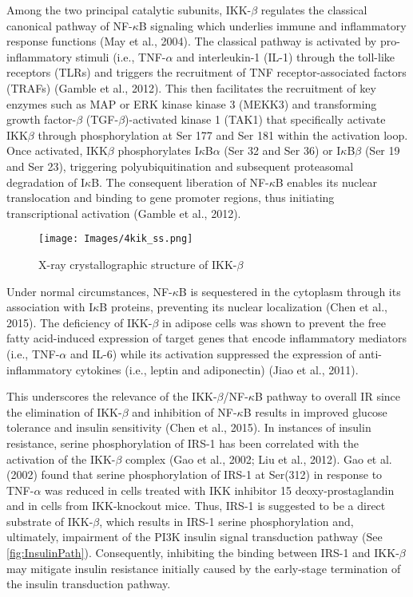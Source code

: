         
Among the two principal catalytic subunits, IKK-$\beta$ regulates the classical canonical pathway of NF-$\kappa$B signaling which underlies immune and inflammatory response functions (May et al., 2004). The classical pathway is activated by pro-inflammatory stimuli (i.e., TNF-$\alpha$ and interleukin-1 (IL-1) through the toll-like receptors (TLRs) and triggers the recruitment of TNF receptor-associated factors (TRAFs) (Gamble et al., 2012). This then facilitates the recruitment of key enzymes such as MAP or ERK kinase kinase 3 (MEKK3) and transforming growth factor-$\beta$ (TGF-$\beta$)-activated kinase 1 (TAK1) that specifically activate IKK$\beta$ through phosphorylation at Ser 177 and Ser 181 within the activation loop. Once activated, IKK$\beta$ phosphorylates I$\kappa$B$\alpha$ (Ser 32 and Ser 36) or I$\kappa$B$\beta$ (Ser 19 and Ser 23), triggering polyubiquitination and subsequent proteasomal degradation of I$\kappa$B. The consequent liberation of NF-$\kappa$B enables its nuclear translocation and binding to gene promoter regions, thus initiating transcriptional activation (Gamble et al., 2012).

    \begin{figure} 
        \centering
        \texttt{[image: Images/4kik\_ss.png]}
        \caption{X-ray crystallographic structure of IKK-$\beta$}
        \label{fig:4kik}
    \end{figure}

Under normal circumstances, NF-$\kappa$B is sequestered in the cytoplasm through its association with I$\kappa$B proteins, preventing its nuclear localization (Chen et al., 2015). The deficiency of IKK-$\beta$ in adipose cells was shown to prevent the free fatty acid-induced expression of target genes that encode inflammatory mediators (i.e., TNF-$\alpha$ and IL-6) while its activation suppressed the expression of anti-inflammatory cytokines (i.e., leptin and adiponectin) (Jiao et al., 2011). 

This underscores the relevance of the IKK-$\beta$/NF-$\kappa$B pathway to overall IR since the elimination of IKK-$\beta$ and inhibition of NF-$\kappa$B results in improved glucose tolerance and insulin sensitivity (Chen et al., 2015). In instances of insulin resistance, serine phosphorylation of IRS-1 has been correlated with the activation of the IKK-$\beta$ complex (Gao et al., 2002; Liu et al., 2012). Gao et al. (2002) found that serine phosphorylation of IRS-1 at Ser(312) in response to TNF-$\alpha$ was reduced in cells treated with IKK inhibitor 15 deoxy-prostaglandin and in cells from IKK-knockout mice. Thus, IRS-1 is suggested to be a direct substrate of IKK-$\beta$, which results in IRS-1 serine phosphorylation and, ultimately, impairment of the PI3K insulin signal transduction pathway (See \ref{fig:InsulinPath}). Consequently, inhibiting the binding between IRS-1 and IKK-$\beta$ may mitigate insulin resistance initially caused by the early-stage termination of the insulin transduction pathway.


